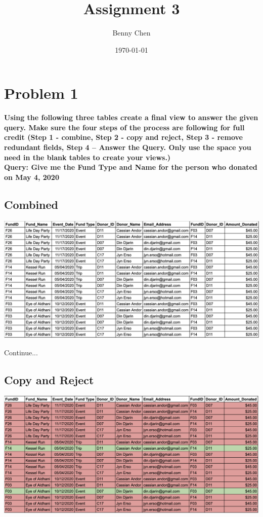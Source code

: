 \documentclass{article}
\title{Assignment 3}
\author{Benny Chen}
\date{\today}
\begin{document}
\maketitle

\section*{Problem 1}

\textbf{Using the following three tables create a final view to answer the given query. Make sure the four steps of the process are following for full credit (Step 1 - combine, Step 2 - copy and reject, Step 3 - remove redundant fields, Step 4 – Answer the Query. Only use the space you need in the blank tables to create your views.)
\\
Query: Give me the Fund Type and Name for the person who donated on May 4, 2020}

\subsection*{Combined}

\begin{center}
    \includegraphics*[scale=.39]{./combine.png}
\end{center}

Continue...

\subsection*{Copy and Reject}

\begin{center}
    \includegraphics*[scale=.39]{./filter.png}
\end{center}
\end{document}
